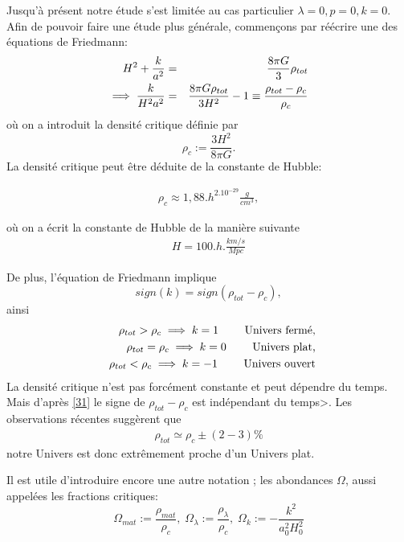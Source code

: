 \documentclass[a4paper,12pt]{report}
\theoremstyle{plain}
\theoremstyle{plain}
\begin{document}
  Jusqu'\`a pr\'esent notre \'etude s'est limit\'ee au cas particulier $ \lambda =0 , p=0 , k=0$.  Afin de pouvoir faire une \'etude plus g\'en\'erale, commen\c cons par r\'e\'ecrire une des \'equations de Friedmann: 
  \begin{eqnarray}
  H^2 + \frac{k}{a^2} &=& \frac{8 \pi G}{3} \rho_{tot} \cr
  \implies \frac{k}{H^2a^2} &= &\frac{8\pi G \rho_{tot}}{3H^2} -1 \equiv \frac{\rho_{tot}-\rho_c}{\rho_c} 
  \end{eqnarray}   
  o\`{u} on a introduit la densit\'e critique d\'efinie par 
  \begin{equation}
  \rho_c := \frac{3H^2}{8\pi G} .
  \end{equation}
  La densit\'e critique peut \^etre d\'eduite de la constante de Hubble: 
  
  \begin{eqnarray}
  \rho_c \approx 1,88.h^2.10^{-29} \frac{g}{cm^3},
  \end{eqnarray}

  o\`{u} on a \'ecrit la constante de Hubble de la mani\`ere suivante 
  \begin{eqnarray} 
  H =100.h. \frac{km/s}{Mpc}
  \end{eqnarray}

  De plus, l'\'equation de Friedmann implique 
  \begin{equation}\label{31}
  sign(k)= sign(\rho_{tot}-\rho_c),
  \end{equation}
  ainsi 
 \begin{eqnarray}
  &&\rho_{tot} > \rho_c \implies k=1 \qquad \text{ Univers ferm\'e, } \cr
  &&\rho_{tot} = \rho_c \implies k=0 \qquad \text{ Univers plat, } \cr
  &&\rho_{tot} < \rho_c \implies k=-1 \qquad  \text{ Univers ouvert } 
  \end{eqnarray}
  La densit\'e critique n'est pas forc\'ement constante et peut d\'ependre du temps. Mais d'apr\`es  \ref{31} le signe de $\rho_{tot}-\rho_c$ est ind\'ependant du temps>. Les observations r\'ecentes sugg\`erent que 
  \begin{eqnarray}
  \rho_{tot} \simeq \rho_c \pm (2-3)  \% 
  \end{eqnarray}
  notre Univers est donc extr\^emement proche d'un Univers plat. 
  
  Il est utile d'introduire encore une autre notation ; les abondances $\Omega $, aussi appel\'ees les fractions critiques: 
  \begin{equation}
  \Omega_{mat} := \frac{\rho_{mat}}{\rho_c} , \; \Omega_\lambda 
  := \frac{\rho_\lambda }{\rho_c} , \; \Omega_k := - \frac{k^2}{a_0^2H_0^2}
  \end{equation}  
  
\end{document}
